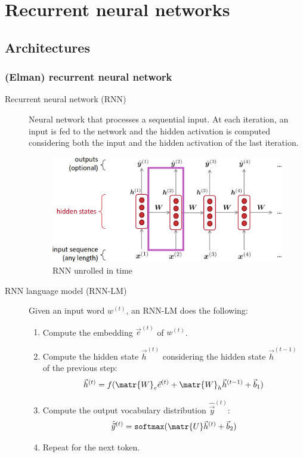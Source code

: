 \chapter{Recurrent neural networks}


\section{Architectures}


\subsection{(Elman) recurrent neural network}

\begin{description}
    \item[Recurrent neural network (RNN)] 
        Neural network that processes a sequential input. At each iteration, an input is fed to the network and the hidden activation is computed considering both the input and the hidden activation of the last iteration.

        \begin{figure}[H]
            \centering
            \includegraphics[width=0.5\linewidth]{./img/rnn_unrolled.png}
            \caption{RNN unrolled in time}
        \end{figure}

    \item[RNN language model (RNN-LM)] 
    Given an input word $w^{(t)}$, an RNN-LM does the following:
    \begin{enumerate}
        \item Compute the embedding $\vec{e}^{(t)}$ of $w^{(t)}$.
        \item Compute the hidden state $\vec{h}^{(t)}$ considering the hidden state $\vec{h}^{(t-1)}$ of the previous step:
        \[ \vec{h}^{(t)} = f(\matr{W}_e \vec{e}^{(t)} + \matr{W}_h \vec{h}^{(t-1)} + \vec{b}_1) \]
        \item Compute the output vocabulary distribution $\hat{\vec{y}}^{(t)}$:
        \[ \hat{\vec{y}}^{(t)} = \texttt{softmax}(\matr{U}\vec{h}^{(t)} + \vec{b}_2) \]
        \item Repeat for the next token.
    \end{enumerate}


\end{description}
